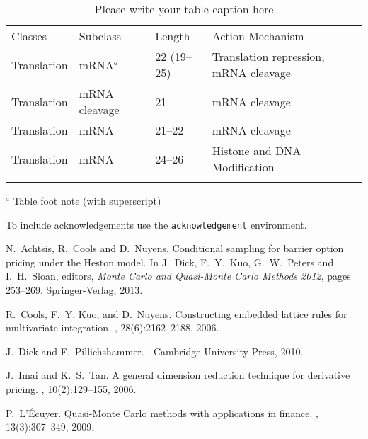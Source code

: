 \documentclass[graybox,footinfo]{svmult}
\begin{document}
%
%
\begin{table}
\caption{Please write your table caption here}\label{tab:1}
%
%
\begin{tabular}{p{2cm}p{2.4cm}p{2cm}p{4.9cm}}
\hline\noalign{\smallskip}
Classes & Subclass & Length & Action Mechanism  \\
\noalign{\smallskip}\svhline\noalign{\smallskip}
Translation & mRNA$^a$  & 22 (19--25) & Translation repression, mRNA cleavage\\
Translation & mRNA cleavage & 21 & mRNA cleavage\\
Translation & mRNA  & 21--22 & mRNA cleavage\\
Translation & mRNA  & 24--26 & Histone and DNA Modification\\
\noalign{\smallskip}\hline\noalign{\smallskip}
\end{tabular}
$^a$ Table foot note (with superscript)
\end{table}

\begin{acknowledgement}
To include acknowledgements use the \verb|acknowledgement| environment.
\end{acknowledgement}


%


%
\begin{thebibliography}{99.}%

N.~Achtsis, R.~Cools and D.~Nuyens.
\newblock Conditional sampling for barrier option pricing under the Heston model.
\newblock In J.~Dick, F.~Y.\ Kuo, G.~W.\ Peters and I.~H.\ Sloan, editors, {\em {M}onte {C}arlo
  and Quasi-{M}onte {C}arlo Methods 2012}, pages 253--269. Springer-Verlag, 2013.

R.~Cools, F.~Y. Kuo, and D.~Nuyens.
\newblock Constructing embedded lattice rules for multivariate integration.
, 28(6):2162--2188, 2006.

J.~Dick and F.~Pillichshammer.
.
\newblock Cambridge University Press, 2010.

J.~{Imai} and K.~S.\ {Tan}.
\newblock A general dimension reduction technique for derivative pricing.
, 10(2):129--155, 2006.
        
 P.~L'{\'E}cuyer.
\newblock Quasi-Monte Carlo methods with applications in finance.
, 13(3):307--349, 2009.

\end{thebibliography}
\end{document}
